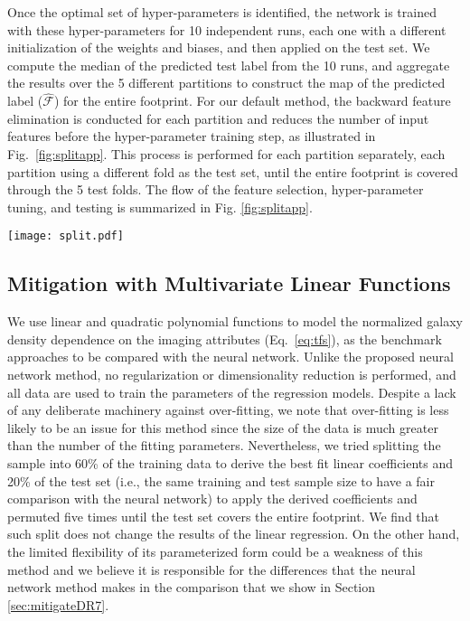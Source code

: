 \documentclass[fleqn, usenatbib]{mnras}
\begin{document}
Once the optimal set of hyper-parameters is identified, the network is trained with these hyper-parameters for 10 independent runs, each one with a different initialization of the weights and biases, and then applied on the test set. We compute the median of the predicted test label from the 10 runs, and aggregate the results over the 5 different partitions to construct the map of the predicted label ($\hat{\mathcal{F}}$) for the entire footprint. For our default method, the backward feature elimination is conducted for each partition and reduces the number of input features before the hyper-parameter training step, as illustrated in Fig.~\ref{fig:splitapp}.  This process is performed for each partition separately, each partition using a different fold as the test set, until the entire footprint is covered through the 5 test folds. The flow of the feature selection, hyper-parameter tuning, and testing is summarized in Fig. \ref{fig:splitapp}.\\

\begin{figure*}
         \centering
         \texttt{[image: split.pdf]}
         \caption{A flow-chart of the backward feature elimination and hyper-parameter tuning for each partition. This entire process is performed five times for each of the five partitions/permutations such that the entire footprint is covered by aggregating different testing folds. }
         \label{fig:splitapp}
\end{figure*}

\subsection{Mitigation with Multivariate Linear Functions}
We use linear and quadratic polynomial functions to model the normalized galaxy density dependence on the imaging attributes (Eq.~\ref{eq:tfs}), as the benchmark approaches to be compared with the neural network. Unlike the proposed neural network method, no regularization or dimensionality reduction is performed, and all data are used to train the parameters of the regression models. Despite a lack of any deliberate machinery against over-fitting, we note that over-fitting is less likely to be an issue for this method since the size of the data is much greater than the number of the fitting parameters. Nevertheless, we tried splitting the sample into 60\% of the training data to derive the best fit linear coefficients and 20\% of the test set (i.e., the same training and test sample size to have a fair comparison with the neural network) to apply the derived coefficients and permuted five times until the test set covers the entire footprint. We find that such split does not change the results of the linear regression. On the other hand, the limited flexibility of its parameterized form could be a weakness of this method and we believe it is responsible for the differences that the neural network method makes in the comparison that we show in Section \ref{sec:mitigateDR7}.\\
\end{document}
